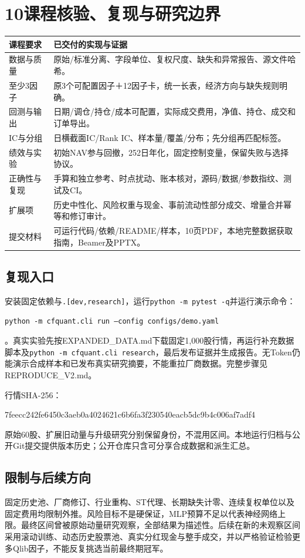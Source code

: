 \documentclass[UTF8,a4paper,10pt]{ctexart}
\newcommand{\page}[1]{\newpage\section*{#1}}
\begin{document}
\page{10\quad 课程核验、复现与研究边界}
\noindent\begin{tabularx}{\textwidth}{lX}\toprule
课程要求 & 已交付的实现与证据\\\midrule
数据与质量 & 原始/标准分离、字段单位、复权尺度、缺失和异常报告、源文件哈希。\\
至少3因子 & 原3个可配置因子＋12因子卡，统一长表，经济方向与缺失规则明确。\\
回测与输出 & 日期/调仓/持仓/成本可配置，实际成交费用，净值、持仓、成交和订单导出。\\
IC与分组 & 日横截面IC/Rank IC、样本量/覆盖/分布；先分组再匹配标签。\\
绩效与实验 & 初始NAV参与回撤，252日年化，固定控制变量，保留失败与选择协议。\\
正确性与复现 & 手算和独立参考、时点扰动、账本核对，源码/数据/参数指纹、测试及CI。\\
扩展项 & 历史中性化、风险权重与现金、事前流动性部分成交、增量合并幂等和修订审计。\\
提交材料 & 可运行代码/依赖/README/样本，10页PDF，本地完整数据获取指南，Beamer及PPTX。\\\bottomrule
\end{tabularx}
\subsection*{复现入口}
安装固定依赖与\texttt{.[dev,research]}，运行\texttt{python -m pytest -q}并运行演示命令：\par\noindent\texttt{python -m cfquant.cli run --config configs/demo.yaml}\par。真实实验先按EXPANDED\_DATA.md下载固定1,000股行情，再运行补充数据脚本及\texttt{python -m cfquant.cli research}，最后发布证据并生成报告。无Token仍能演示合成样本和已发布真实研究摘要，不能重拉厂商数据。完整步骤见REPRODUCE\_V2.md。

\noindent 行情SHA-256：\par{\ttfamily\scriptsize 7feecc242fe6450c3aeb0a4024621c6b6fa3f230540eacb5dc9b4c006af7adf4}\par
原始60股、扩展旧动量与升级研究分别保留身份，不混用区间。本地运行归档与公开Git提交提供版本历史；公开仓库只含可分享合成数据和派生汇总。
\subsection*{限制与后续方向}
固定历史池、厂商修订、行业重构、ST代理、长期缺失计零、连续复权单位以及固定费用均限制外推。风险目标不是硬保证，MLP预算不足以代表神经网络上限。最终区间曾被原始动量研究观察，全部结果为描述性。后续在新的未观察区间采用滚动训练、动态历史股票池、真实分红现金与整手成交，并以严格验证检验更多Qlib因子，不能反复挑选当前最终期冠军。
\end{document}
